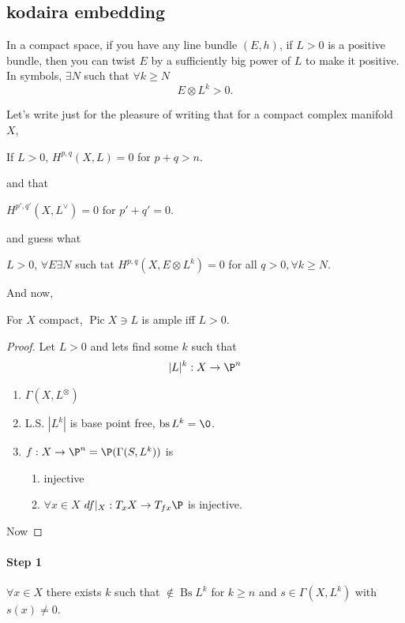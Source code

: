 \subsection{kodaira embedding}\label{sec:June 19}
\begin{coro}[3]
	In a compact space, if you have any line bundle $(E,h)$, if $L>0$ is a positive bundle, then you can twist $E$ by a sufficiently big power of $L$ to make it positive. In symbols, $\exists N$ such that $\forall k\geq N$
	\[E\otimes L^k>0.\]
\end{coro}
Let's write just for the pleasure of writing that for a compact complex manifold $X$,
\begin{thm}
	If $L>0$, $H^{p,q}(X,L)=0$ for $p+q>n$.
\end{thm}
and that
\begin{thm}
	$H^{p',q'}(X,L^\vee)=0$ for $p'+q'=0$.
\end{thm}
and guess what
\begin{thm}
	$L>0$, $\forall E \exists N$ such tat $H^{p,q}(X,E\otimes L^k)=0$ for all $q>0, \forall k\geq N$.
\end{thm}
And now,
\begin{thm}
	For $X$ compact, $\operatorname{Pic}X\ni L$ is ample iff $L>0$.
\end{thm}
\begin{proof}
	Let $L>0$ and lets find some $k$ such that
	\[|L|^k:X\to\P^n\]
	\begin{enumerate}
		\item $\Gamma(X,L^{\otimes })$
		\item L.S. $|L^k|$ is base point free, $\operatorname{bs}L^k=\0$.
		\item $f:X\to \P^n=\P(\Gamma(S,L^k))$  is
			\begin{enumerate}
				\item injective
				\item $\forall x\in X$  $df|_X:T_xX\to T_{fx}\P$ is injective.
			\end{enumerate}
			
	\end{enumerate}
	Now

\end{proof}

\paragraph{Step 1} $\forall x\in X$ there exists $k$ such that $\notin \operatorname{Bs}L^k$ for $k\geq n$ and $s \in \Gamma(X,L^k)$ with $s(x)\neq 0$.

